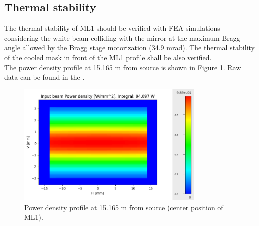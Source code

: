 \clearpage
\subsection{Thermal stability}
The thermal stability of ML1 should be verified with FEA simulations considering the white beam colliding with the mirror at the maximum Bragg angle allowed by the Bragg stage motorization (34.9 mrad). The thermal stability of the cooled mask in front of the ML1 profile shall be also verified.\\

The power density profile at 15.165 m from source is shown in Figure \ref{fig:power_profile_ML1}. Raw data can be found in the \powerprofilesurl. \\
\begin{figure}[ht]
\centering
\includegraphics[width=0.8\textwidth]{./../../power_profiles/power_profile_ML1.png}
\caption{\label{fig:power_profile_ML1} Power density profile at 15.165 m from source (center position of ML1).}
\end{figure}